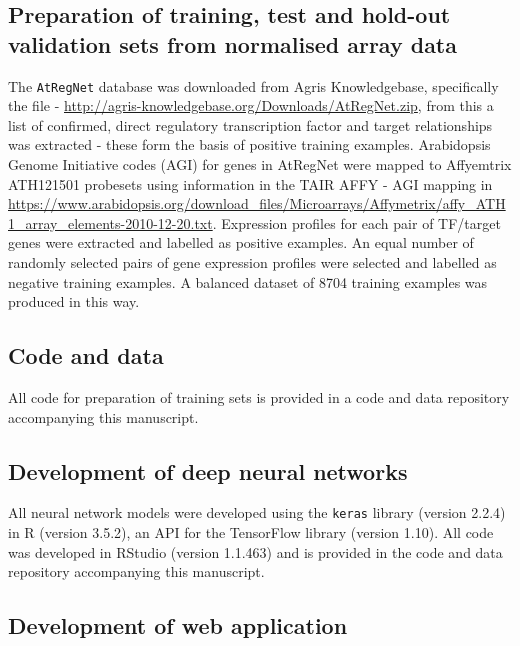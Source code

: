 \documentclass[12pt,a4paper,]{article}
\begin{document}
\hypertarget{preparation-of-training-test-and-hold-out-validation-sets-from-normalised-array-data}{%
\subsection{Preparation of training, test and hold-out validation sets from normalised array data}\label{preparation-of-training-test-and-hold-out-validation-sets-from-normalised-array-data}}

The \texttt{AtRegNet} database was downloaded from Agris Knowledgebase, specifically the file - \href{}{http://agris-knowledgebase.org/Downloads/AtRegNet.zip}, from this a list of confirmed, direct regulatory transcription factor and target relationships was extracted - these form the basis of positive training examples. Arabidopsis Genome Initiative codes (AGI) for genes in AtRegNet were mapped to Affyemtrix ATH121501 probesets using information in the TAIR AFFY - AGI mapping in \href{}{https://www.arabidopsis.org/download\_files/Microarrays/Affymetrix/affy\_ATH1\_array\_elements-2010-12-20.txt}. Expression profiles for each pair of TF/target genes were extracted and labelled as positive examples. An equal number of randomly selected pairs of gene expression profiles were selected and labelled as negative training examples. A balanced dataset of 8704 training examples was produced in this way.

\hypertarget{code-and-data}{%
\subsection{Code and data}\label{code-and-data}}

All code for preparation of training sets is provided in a code and data repository accompanying this manuscript.

\hypertarget{development-of-deep-neural-networks}{%
\subsection{Development of deep neural networks}\label{development-of-deep-neural-networks}}

All neural network models were developed using the \texttt{keras} library (version 2.2.4) in R (version 3.5.2), an API for the TensorFlow library (version 1.10). All code was developed in RStudio (version 1.1.463) and is provided in the code and data repository accompanying this manuscript.

\hypertarget{development-of-web-application}{%
\subsection{Development of web application}\label{development-of-web-application}}
\end{document}
